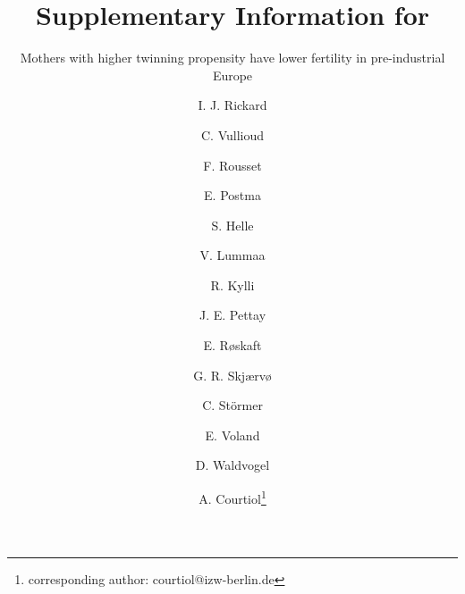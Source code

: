 \documentclass[a4paper]{article}\usepackage[]{graphicx}\usepackage[]{color}
\title{Supplementary Information for}
\subtitle{Mothers with higher twinning propensity have lower fertility in pre-industrial Europe}
\author{I. J. Rickard \and C. Vullioud \and F. Rousset \and E. Postma \and S.
Helle \and V. Lummaa \and R. Kylli \and J. E. Pettay \and E.
Røskaft \and G. R. Skjærvø \and C. Störmer \and E. Voland \and D.
Waldvogel \and A. Courtiol\footnote{corresponding author: courtiol@izw-berlin.de}}
\date{}
\begin{document}
\renewcommand{\thetable}{S\arabic{table}}
\renewcommand{\thefigure}{S\arabic{figure}}



\maketitle

\tableofcontents

\newpage

\listoffigures

\newpage

\listoftables

\newpage

%
%
\end{document}
